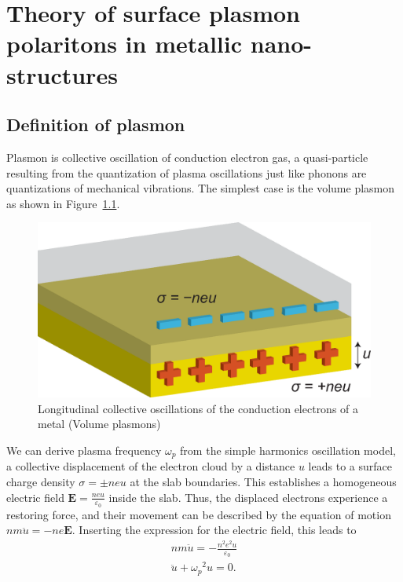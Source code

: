\chapter{Theory of surface plasmon polaritons in metallic nano-structures}
\label{c:thm}
\section{Definition of plasmon}

Plasmon is collective oscillation of conduction electron gas, a quasi-particle resulting from the quantization of plasma oscillations just like phonons are quantizations of mechanical vibrations. The simplest case is the volume plasmon as shown in Figure~\ref{fig:bulk}.
\begin{figure}[htb]
\centering
\includegraphics[scale=0.5]{THM/bulk.eps}
\caption{\label{fig:bulk}Longitudinal collective oscillations of the conduction electrons of a metal (Volume plasmons)}
\end{figure}
 We can derive plasma frequency $\omega_p$ from the simple harmonics oscillation model, a collective displacement of the electron cloud by a distance $u$ leads to a surface charge density $\sigma = \pm neu$ at the slab boundaries. This establishes a homogeneous electric field $\mathbf{E} = \frac{neu}{\varepsilon_0}$ inside the slab. Thus, the displaced electrons experience a restoring force, and their movement can be described by the equation of motion $nm\ddot{u} = -ne\mathbf{E}$. Inserting the expression for the electric field, this leads to
 \begin{subequations}
 \begin{align}
 nm\ddot{u} = -\frac{n^2e^2u}{\varepsilon_0} \\
 \ddot{u} + {\omega_p}^{2}u = 0\text{.}
 \end{align}
 \end{subequations}
